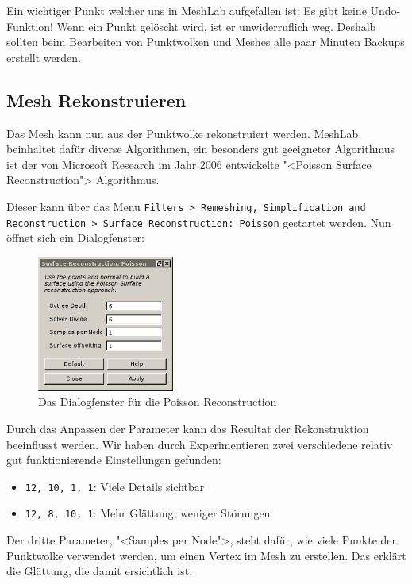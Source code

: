 Ein wichtiger Punkt welcher uns in MeshLab aufgefallen ist: Es gibt keine
Undo-Funktion! Wenn ein Punkt gelöscht wird, ist er unwiderruflich weg.  Deshalb
sollten beim Bearbeiten von Punktwolken und Meshes alle paar Minuten Backups
erstellt werden.

\subsection{Mesh Rekonstruieren}

Das Mesh kann nun aus der Punktwolke rekonstruiert werden. MeshLab beinhaltet
dafür diverse Algorithmen, ein besonders gut geeigneter Algorithmus ist der von
Microsoft Research im Jahr 2006 entwickelte "<Poisson Surface
Reconstruction">\cite{kazhdan:2006} Algorithmus.

Dieser kann über das Menu \texttt{Filters > Remeshing, Simplification and
Reconstruction > Surface Reconstruction: Poisson} gestartet werden. Nun öffnet
sich ein Dialogfenster:

\begin{figure}[H]
	\centering
	\includegraphics[width=0.4\textwidth]{images/poisson_dialog.png}
	\caption{Das Dialogfenster für die Poisson Reconstruction}
	\label{img:meshlab_poisson_dialog}
\end{figure}

Durch das Anpassen der Parameter kann das Resultat der Rekonstruktion
beeinflusst werden. Wir haben durch Experimentieren zwei verschiedene
relativ gut funktionierende Einstellungen gefunden:

\begin{itemize}
	\setlength\itemsep{0.3em}
	\item \texttt{12, 10, 1, 1}: Viele Details sichtbar
	\item \texttt{12, 8, 10, 1}: Mehr Glättung, weniger Störungen
\end{itemize}

\noindent Der dritte Parameter, "<Samples per Node">, steht dafür, wie viele
Punkte der Punktwolke verwendet werden, um einen Vertex im Mesh zu erstellen.
Das erklärt die Glättung, die damit ersichtlich ist.

